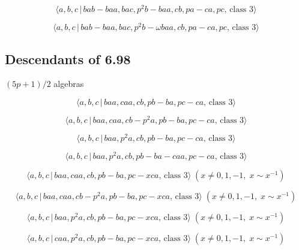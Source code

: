 \documentclass[10pt]{article}
\begin{document}
\begin{equation}
\langle a,b,c\,|\,bab-baa,bac,p^2b-baa,cb,pa-ca,pc,\,\text{class }3\rangle 
\tag{7.2929}
\end{equation}

\begin{equation}
\langle a,b,c\,|\,bab-baa,bac,p^{2}b-\omega baa,cb,pa-ca,pc,\,\text{class }%
3\rangle  \tag{7.2930}
\end{equation}

\subsection{Descendants of 6.98}

$(5p+1)/2$ algebras

\begin{equation}
\langle a,b,c\,|\,baa,caa,cb,pb-ba,pc-ca,\,\text{class }3\rangle 
\tag{7.2931}
\end{equation}

\begin{equation}
\langle a,b,c\,|\,baa,caa,cb-p^2a,pb-ba,pc-ca,\,\text{class }3\rangle 
\tag{7.2932}
\end{equation}

\begin{equation}
\langle a,b,c\,|\,baa,p^2a,cb,pb-ba,pc-ca,\,\text{class }3\rangle 
\tag{7.2933}
\end{equation}

\begin{equation}
\langle a,b,c\,|\,baa,p^2a,cb,pb-ba-caa,pc-ca,\,\text{class }3\rangle 
\tag{7.2934}
\end{equation}

\begin{equation}
\langle a,b,c\,|\,baa,caa,cb,pb-ba,pc-xca,\,\text{class }3\rangle \;(x\neq
0,1,-1,\;x\sim x^{-1})  \tag{7.2935}
\end{equation}

\begin{equation}
\langle a,b,c\,|\,baa,caa,cb-p^{2}a,pb-ba,pc-xca,\,\text{class }3\rangle
\;(x\neq 0,1,-1,\;x\sim x^{-1})  \tag{7.2936}
\end{equation}

\begin{equation}
\langle a,b,c\,|\,baa,p^{2}a,cb,pb-ba,pc-xca,\,\text{class }3\rangle
\;(x\neq 0,1,-1,\;x\sim x^{-1})  \tag{7.2937}
\end{equation}

\begin{equation}
\langle a,b,c\,|\,caa,p^{2}a,cb,pb-ba,pc-xca,\,\text{class }3\rangle
\;(x\neq 0,1,-1,\;x\sim x^{-1})  \tag{7.2938}
\end{equation}
\end{document}
